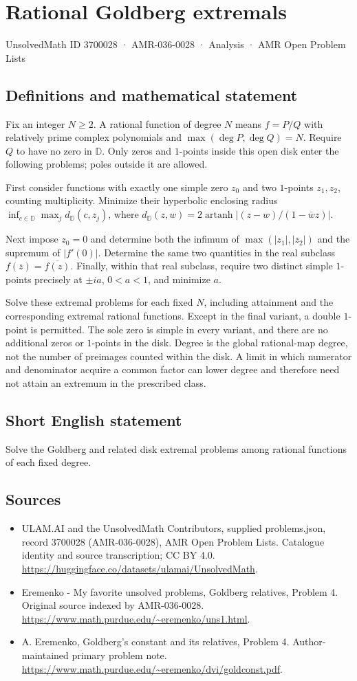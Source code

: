 \documentclass[11pt,a4paper]{article}
\begin{document}
\section*{Rational Goldberg extremals}\label{3700028}
{\small UnsolvedMath ID 3700028 · AMR-036-0028 · Analysis · AMR Open Problem Lists}
\subsection{Definitions and mathematical statement}
Fix an integer $N\geq2$. A rational function of degree
$N$ means $f=P/Q$ with relatively prime complex
polynomials and $\max(\deg P,\deg Q)=N$.
Require $Q$ to have no zero in $\mathbb D$.
Only zeros and $1$-points inside this open disk enter
the following problems; poles outside it are allowed.

First consider functions with exactly one simple zero
$z_0$ and two $1$-points $z_1,z_2$, counting
multiplicity. Minimize their hyperbolic enclosing radius
$\inf_{c\in\mathbb D}\max_jd_{\mathbb D}(c,z_j)$,
where
$d_{\mathbb D}(z,w)=2\operatorname{artanh}
|(z-w)/(1-\overline w z)|$.

Next impose $z_0=0$ and determine both the infimum
of $\max(|z_1|,|z_2|)$ and the supremum of
$|f'(0)|$. Determine the same two quantities in the
real subclass $f(\overline z)=\overline{f(z)}$.
Finally, within that real subclass, require two
distinct simple $1$-points precisely at $\pm ia$,
$0<a<1$, and minimize $a$.

Solve these extremal problems for each fixed $N$,
including attainment and the corresponding extremal
rational functions. Except in the final variant,
a double $1$-point is permitted. The sole zero is
simple in every variant, and there are no additional
zeros or $1$-points in the disk.
Degree is the global rational-map degree, not the
number of preimages counted within the disk. A
limit in which numerator and denominator acquire a
common factor can lower degree and therefore need
not attain an extremum in the prescribed class.
\subsection{Short English statement}
Solve the Goldberg and related disk extremal problems among rational functions of each fixed degree.
\subsection{Sources}
\begin{itemize}
\item[S1] ULAM.AI and the UnsolvedMath Contributors, supplied problems.json, record 3700028 (AMR-036-0028), AMR Open Problem Lists. Catalogue identity and source transcription; CC BY 4.0.
\url{https://huggingface.co/datasets/ulamai/UnsolvedMath}.
\item[S2] Eremenko - My favorite unsolved problems, Goldberg relatives, Problem 4. Original source indexed by AMR-036-0028.
\url{https://www.math.purdue.edu/~eremenko/uns1.html}.
\item[S3] A. Eremenko, Goldberg's constant and its relatives, Problem 4. Author-maintained primary problem note.
\url{https://www.math.purdue.edu/~eremenko/dvi/goldconst.pdf}.
\end{itemize}
\end{document}
